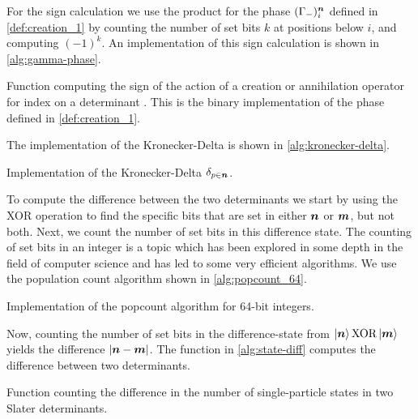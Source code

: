             For the sign calculation we use the product for the phase
            $(\Gamma_{-})^{\boldsymbol{n}}_i$ defined in \autoref{def:creation_1} by
            counting the number of set bits $k$ at positions below $i$, and
            computing $(-1)^k$.
            An implementation of this sign calculation is shown in
            \autoref{alg:gamma-phase}.
            \begin{algorithm}
                \caption{Function computing the sign of the action of a creation
                or annihilation operator for index  on a determinant
                .
                This is the binary implementation of the phase defined in
                \autoref{def:creation_1}.}
                \label{alg:gamma-phase}
            \end{algorithm}
            The implementation of the Kronecker-Delta is shown in
            \autoref{alg:kronecker-delta}.
            \begin{algorithm}
                \caption{Implementation of the Kronecker-Delta $\delta_{p \in
                \boldsymbol{n}}$.}
                \label{alg:kronecker-delta}
            \end{algorithm}
            To compute the difference between the two determinants we start by
            using the XOR operation to find the specific bits that are set in
            either $\boldsymbol{n}$ or $\boldsymbol{m}$, but not both.
            Next, we count the number of set bits in this difference state.
            The counting of set bits in an integer is a topic which has been
            explored in some depth in the field of computer science and has led
            to some very efficient algorithms.
            We use the population count algorithm \cite{wiki:popcount} shown in
            \autoref{alg:popcount_64}.
            \begin{algorithm}
                \caption{Implementation of the popcount algorithm for 64-bit
                integers.}
                \label{alg:popcount_64}
            \end{algorithm}
            Now, counting the number of set bits in the difference-state from
            $\ket{\boldsymbol{n}} \text{XOR} \ket{\boldsymbol{m}}$ yields the difference
            $\abs{\boldsymbol{n} - \boldsymbol{m}}$.
            The function in \autoref{alg:state-diff} computes the difference
            between two determinants.
            \begin{algorithm}
                \caption{Function counting the difference in the number of
                single-particle states in two Slater determinants.}
                \label{alg:state-diff}
            \end{algorithm}

